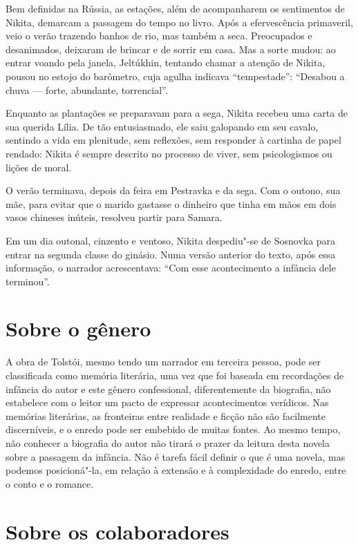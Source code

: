 Bem definidas na Rússia, as estações, além de acompanharem os
sentimentos de Nikita, demarcam a passagem do tempo no livro. Após a
efervescência primaveril, veio o verão trazendo banhos de rio, mas
também a seca. Preocupados e desanimados, deixaram de brincar e de
sorrir em casa. Mas a sorte mudou: ao entrar voando pela janela,
Jeltúkhin, tentando chamar a atenção de Nikita, pousou no estojo do
barômetro, cuja agulha indicava ``tempestade'': ``Desabou a chuva ---
forte, abundante, torrencial''.

Enquanto as plantações se preparavam para a sega, Nikita recebeu uma
carta de sua querida Lília. De tão entusiasmado, ele saiu galopando em
seu cavalo, sentindo a vida em plenitude, sem reflexões, sem responder à
cartinha de papel rendado: Nikita é sempre descrito no processo de
viver, sem psicologismos ou lições de moral.

O verão terminava, depois da feira em Pestravka e da sega. Com o outono,
sua mãe, para evitar que o marido gastasse o dinheiro que tinha em mãos
em dois vasos chineses inúteis, resolveu partir para Samara.

Em um dia outonal, cinzento e ventoso, Nikita despediu"-se de Sosnovka
para entrar na segunda classe do ginásio. Numa versão anterior do texto,
após essa informação, o narrador acrescentava: ``Com esse acontecimento
a infância dele terminou''.

\section{Sobre o gênero}\label{para3}

A obra de Tolstói, mesmo tendo um narrador em terceira pessoa, pode ser
classificada como memória literária, uma vez que foi baseada em
recordações de infância do autor e este gênero confessional,
diferentemente da biografia, não estabelece com o leitor um pacto de
expressar acontecimentos verídicos. Nas memórias literárias, as
fronteiras entre realidade e ficção não são facilmente discerníveis, e o
enredo pode ser embebido de muitas fontes. Ao mesmo tempo, não conhecer
a biografia do autor não tirará o prazer da leitura desta novela sobre a
passagem da infância. Não é tarefa fácil definir o que é uma novela, mas
podemos posicioná"-la, em relação à extensão e à complexidade do enredo,
entre o conto e o romance.

\section{Sobre os colaboradores}


